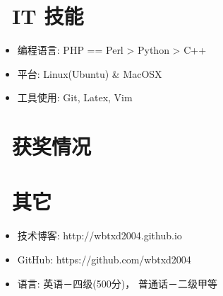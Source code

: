 \documentclass{resume}
\begin{document}

\section{\faCogs\ IT 技能}
\begin{itemize}[parsep=0.5ex]
  \item 编程语言: PHP == Perl > Python > C++
  \item 平台: Linux(Ubuntu) \& MacOSX
  \item 工具使用: Git, Latex,  Vim
\end{itemize}

\section{\faHeartO\ 获奖情况}

\section{\faInfo\ 其它}
\begin{itemize}[parsep=0.5ex]
  \item 技术博客: http://wbtxd2004.github.io
  \item GitHub: https://github.com/wbtxd2004
  \item 语言: 英语－四级(500分)， 普通话－二级甲等
\end{itemize}

%
%
\end{document}
